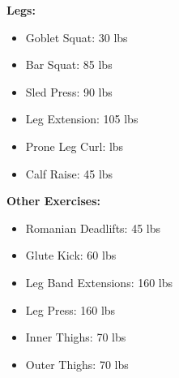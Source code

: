 \documentclass{article}
\begin{document}
\def\gs{30 }
\def\bs{85 }
\def\sp{90 }
\def\le{105 }
\def\lc{160 }
\ded{}
\def\cr{45 }

\def\rdl{45 }
\def\gk{60 }
\def\lbe{160 }
\def\lp{160 }
\def\it{70 }
\def\ot{70 }

\textbf{Legs:}
\begin{itemize}
	\item Goblet Squat: \hfill\gs lbs
	\item Bar Squat: \hfill\bs lbs
	\item Sled Press: \hfill\sp lbs
	\item Leg Extension: \hfill\le lbs
	\item Prone Leg Curl: \hfill\plc lbs
	\item Calf Raise: \hfill\cr lbs
\end{itemize}\leavevmode\newline

\textbf{Other Exercises:}
\begin{itemize}
	\item Romanian Deadlifts: \hfill\rdl lbs
	\item Glute Kick: \hfill\gk lbs
	\item Leg Band Extensions: \hfill\lbe lbs
	\item Leg Press: \hfill\lp lbs
 \item Inner Thighs: \hfill\it lbs
 \item Outer Thighs: \hfill\ot lbs
\end{itemize}
\end{document}
